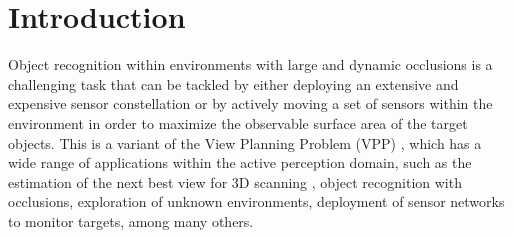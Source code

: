 \section{Introduction}\label{sec:introduction}


Object recognition within environments with large and dynamic occlusions is a challenging task that can be tackled by either deploying an extensive and expensive sensor constellation or by actively moving a set of sensors within the environment in order to maximize the observable surface area of the target objects. This is a variant of the View Planning Problem (VPP) \cite{Zeng2020}, which has a wide range of applications within the active perception domain, such as the estimation of the next best view for 3D scanning \cite{Mendoza2020}, object recognition with occlusions, exploration of unknown environments, deployment of sensor networks to monitor targets, among many others.


